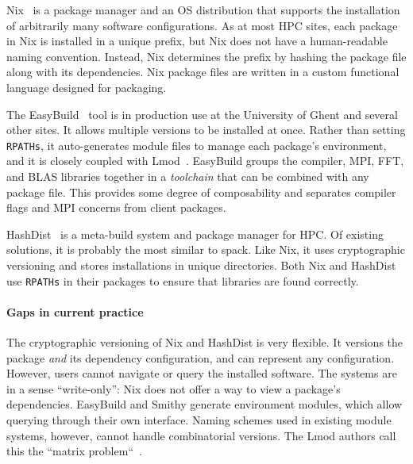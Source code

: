 Nix~\cite{dolstra+:icfp08,dolstra+:lisa04}
is a package manager and an OS distribution that supports the installation of
arbitrarily many software configurations.  As at most HPC sites, each package
in Nix is installed in a unique prefix, but Nix does not have a human-readable
naming convention.  Instead, Nix determines the prefix by hashing the package
file along with its dependencies. Nix package files are written in a custom
functional language designed for packaging.

The EasyBuild~\cite{hoste+:pyhpc12} tool is in production use at
the University of Ghent and several other sites.  It allows multiple versions
to be installed at once.  Rather than setting {\tt RPATHs}, it
auto-generates module files
to manage each package's environment, and it is closely coupled with
Lmod~\cite{geimer+:hust14}.  EasyBuild groups the compiler, MPI, FFT, and
BLAS libraries together in a {\it toolchain} that can be combined with
any package file. This provides some degree of composability and
separates compiler flags and MPI concerns from client packages.

HashDist~\cite{hashdist} is a meta-build system and package manager for HPC.
Of existing solutions, it is probably the most similar to spack.
Like Nix, it uses cryptographic versioning and stores installations in unique
directories.
%
Both Nix and HashDist use {\tt RPATHs} in their packages to ensure that
libraries are found correctly.

\paragraph{Gaps in current practice}
The cryptographic versioning of Nix and HashDist is very flexible. It versions
the package {\it and} its dependency configuration, and can represent any
configuration. However, users cannot navigate or query the installed software.
The systems are in a sense ``write-only'':
Nix does not offer a way to view a package's dependencies.
%
EasyBuild and Smithy generate environment modules, which allow querying
through their own interface. Naming schemes used in existing module systems, however, cannot
handle combinatorial versions. The Lmod authors call this the
``matrix problem``~\cite{mclay:lmod-tutorial}.


